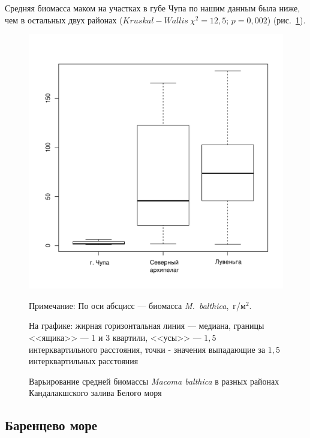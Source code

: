 Средняя биомасса маком на участках в губе Чупа по нашим данным была ниже, чем в остальных двух районах ($Kruskal-Wallis~\chi^2 = 12,5$; $p = 0,002$) (рис.~\ref{ris:B_region_White}).
	\begin{figure}[hp]
	\begin{center}	
		\includegraphics[height=0.5\textheight]{../All_B/Bmean_region_White1.pdf}
	\end{center}
	\caption{Варьирование средней биомассы {\it Macoma balthica} в разных районах Кандалакшского залива Белого моря}
	{\footnotesize Примечание: По оси абсцисс --- биомасса {\it M.~balthica},~г/м$^2$.

	На графике: жирная горизонтальная линия --- медиана, границы <<ящика>> --- 1 и 3 квартили, <<усы>> --- $1,5$ интерквартильного расстояния, точки - значения выпадающие за $1,5$ интерквартильных расстояния}
	\label{ris:B_region_White}
	\end{figure}


	\subsection{Баренцево море}

